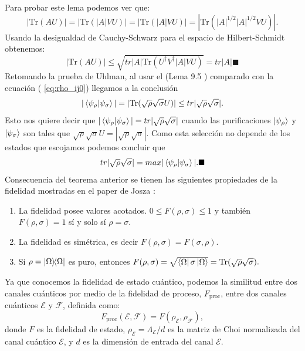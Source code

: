 \documentclass[letterpaper,12pt]{thesisECFM}
\theoremstyle{plain}
\theoremstyle{definition}
\theoremstyle{definition}
\theoremstyle{remark}
\newcommand{\1}{\mathbb{1}}
\begin{document}
    Para probar este lema podemos ver que:
    \begin{equation}
        |\text{Tr}(AU)| = |\text{Tr}(|A|VU)| = \left| \text{Tr}(|A|VU  ) \right| = \left|\text{Tr}(|A|^{1/2}|A|^{1/2} VU )   \right|.
    \end{equation}
    Usando la desigualdad de Cauchy-Schwarz \cite{nielsen_chuang_2011} para el espacio de Hilbert-Schmidt obtenemos:
    \begin{equation}
        |\text{Tr}(AU)| \leq \sqrt{ tr|A| \text{Tr}(U^\dagger V^ \dagger  |A|VU) } = tr|A| \blacksquare  
    \end{equation} 
    Retomando la prueba de Uhlman, al usar el (Lema 9.5 ) comparado con la ecuación ( \ref{eq:rho_ij0})  llegamos a la conclusión
    \begin{equation}
        |\braket{\psi_\rho}{\psi_\sigma}| = |\text{Tr}(\sqrt{\rho} \sqrt{\sigma} U )| \leq tr|\sqrt{\rho} \sqrt{\sigma} |.
    \end{equation}
    Esto nos quiere decir que $|\braket{\psi_\rho}{\psi_\sigma}| = tr| \sqrt{\rho}\sqrt{\sigma}|$ cuando las purificaciones $\ket{\psi_\rho}$ y $\ket{\psi_\sigma}$ son tales que $\sqrt{\rho}\sqrt{\sigma} U = |\sqrt{\rho}\sqrt{\sigma}|$. Como esta selección no depende de los estados que escojamos podemos concluir que
    \begin{equation}
        tr|\sqrt{\rho}\sqrt{\sigma}| = max | \braket{\psi_\rho}{\psi_\sigma}|. \blacksquare
    \end{equation}
    Consecuencia del teorema anterior se tienen las siguientes propiedades de la fidelidad mostradas en el paper de Josza \cite{Jozsa}:
    \begin{enumerate}
        \item La fidelidad posee valores acotados. $0 \leq F(\rho,\sigma) \leq 1$ y también $F(\rho,\sigma)=1 $ sí y solo sí $\rho=\sigma$.
	\item La fidelidad es simétrica, es decir  $F(\rho,\sigma) = F(\sigma,\rho).$
        \item Si $\rho= \ketbra{\Omega}{\Omega}$ es puro, entonces $F(\rho,\sigma)= \sqrt{\bra{\Omega}\sigma \ket{\Omega}} = \text{Tr}(\sqrt{\rho} \sqrt{\sigma}).$
    \end{enumerate}

    
Ya que conocemos la fidelidad de estado cuántico, podemos la similitud entre dos canales cuánticos por medio de la  fidelidad de proceso, $F_{\text{proc}}$, entre dos canales cuánticos $\mathcal{E}$ y $\mathcal{F}$, definida como:
\begin{equation} \label{ec:fidel_proc}
F_{\text{proc}}(\mathcal{E}, \mathcal{F}) = F(\rho_{\mathcal{E}}, \rho_{\mathcal{F}}), 
\end{equation}
donde $F$ es la fidelidad de estado,  $\rho_{\mathcal{E}} =  \Lambda_{\mathcal{E}}/d $ es la matriz de Choi normalizada del canal cuántico $\mathcal{E}$, y $d$ es la dimensión de entrada del canal $\mathcal{E}$. 
\end{document}
